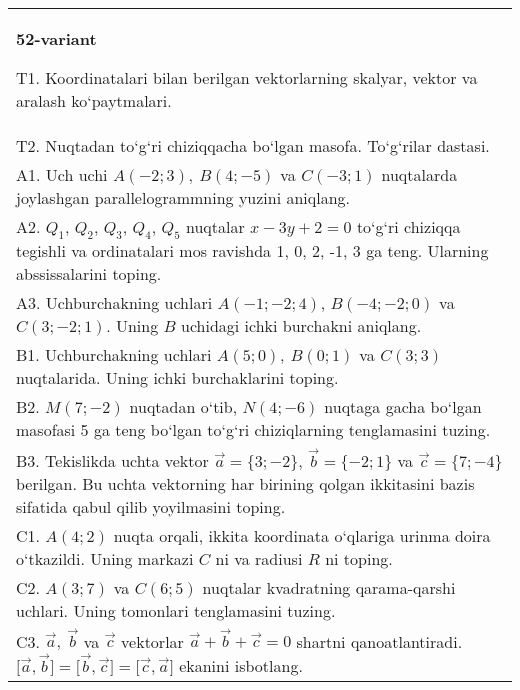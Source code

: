 \documentclass{article}
\begin{document}
\begin{tabular}{m{17cm}}
\textbf{52-variant}
\newline

T1. 
Koordinatalari bilan berilgan vektorlarning skalyar, vektor va aralash ko‘paytmalari. \\
T2. 
Nuqtadan to‘g‘ri chiziqqacha bo‘lgan masofa. To‘g‘rilar dastasi.
 \\
A1. 
Uch uchi $A (-2;3), \ B (4;-5) $ va
$C (-3;1)$ nuqtalarda joylashgan parallelogrammning yuzini aniqlang.
 \\
A2. 
$Q_1$, $Q_2$, $Q_3$, $Q_4$, $Q_5$ nuqtalar
$x-3y+2=0$ to‘g‘ri chiziqqa tegishli va ordinatalari mos ravishda
1, 0, 2, -1, 3 ga teng. Ularning abssissalarini toping.
 \\
A3. 
Uchburchakning uchlari
$A (- 1; - 2;4) $, $B (- 4; - 2;0) $ va $C (3; -2;1) $. Uning $B$ uchidagi
ichki burchakni aniqlang.
 \\
B1. 
Uchburchakning uchlari \(A (5;0),\ B (0;1) \) va \(C (3;3) \)
nuqtalarida. Uning ichki burchaklarini toping.
 \\
B2. 
\(M (7;-2) \) nuqtadan o‘tib, \(N (4;-6) \) nuqtaga
gacha bo‘lgan masofasi 5 ga teng bo‘lgan to‘g‘ri chiziqlarning tenglamasini tuzing.
 \\
B3. Tekislikda uchta vektor $\vec{a} = \{ 3; - 2\}$, $\vec{b} = \{ - 2;1\}$ va $\vec{c} = \{ 7; - 4\}$ berilgan. Bu uchta vektorning har birining qolgan ikkitasini bazis sifatida qabul qilib yoyilmasini toping.
 \\
C1. \(A (4;2) \) nuqta orqali, ikkita koordinata o‘qlariga
urinma doira o‘tkazildi. Uning markazi $C$ ni va radiusi
$R$ ni toping.
 \\
C2. 
\(A (3;7) \) va \(C (6; 5) \) nuqtalar kvadratning
qarama-qarshi uchlari. Uning tomonlari tenglamasini tuzing.
 \\
C3. 
\(\vec{a},\ \vec{b}\) va \(\vec{c}\) vektorlar \(\vec{a} + \vec{b} + \vec{c} = 0\) shartni qanoatlantiradi. \(\lbrack\vec{a},\vec{b}\rbrack = \lbrack\vec{b},\vec{c}\rbrack = \lbrack\vec{c},\vec{a}\rbrack\) ekanini isbotlang.
 \\

\end{tabular}
\vspace{1cm}
\end{document}
